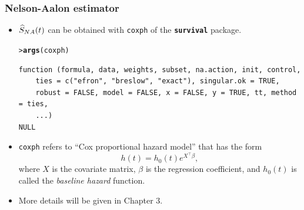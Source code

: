 \documentclass[10pt]{beamer}\usepackage[]{graphicx}\usepackage[]{color}
\makeatletter
\newcommand{\hlstd}[1]{\textcolor[rgb]{0.345,0.345,0.345}{#1}}%
\newcommand{\hlkwd}[1]{\textcolor[rgb]{0.737,0.353,0.396}{\textbf{#1}}}%
\newenvironment{kframe}{%
 \def\at@end@of@kframe{}%
 \ifinner\ifhmode%
  \def\at@end@of@kframe{\end{minipage}}%
  \begin{minipage}{\columnwidth}%
 \fi\fi%
 \def\FrameCommand##1{\hskip\@totalleftmargin \hskip-\fboxsep
 \colorbox{shadecolor}{##1}\hskip-\fboxsep
     \hskip-\linewidth \hskip-\@totalleftmargin \hskip\columnwidth}%
 \MakeFramed {\advance\hsize-\width
   \@totalleftmargin\z@ \linewidth\hsize
   \@setminipage}}%
 {\par\unskip\endMakeFramed%
 \at@end@of@kframe}
\newenvironment{knitrout}{}{} %
\renewenvironment{knitrout}{\setlength{\topsep}{-.2mm}}{}
\newcommand{\pkg}[1]{{\textbf{\texttt{#1}}}}
\newcommand{\code}[1]{{\texttt{#1}}}
\newcommand{\Sna}{\widehat{S}_{\scriptsize{NA}}}
\makeatother
\begin{document}
\begin{frame}[fragile]
  \frametitle{Nelson-Aalon estimator}
  \begin{itemize}
  \item $\Sna(t)$ can be obtained with \code{coxph} of the \pkg{survival} package.
\begin{knitrout}\scriptsize
{}\color{fgcolor}\begin{kframe}
\begin{alltt}
\hlstd{> }\hlkwd{args}\hlstd{(coxph)}
\end{alltt}
\begin{verbatim}
function (formula, data, weights, subset, na.action, init, control, 
    ties = c("efron", "breslow", "exact"), singular.ok = TRUE, 
    robust = FALSE, model = FALSE, x = FALSE, y = TRUE, tt, method = ties, 
    ...) 
NULL
\end{verbatim}
\end{kframe}
\end{knitrout}
  \item \code{coxph} refers to ``Cox proportional hazard model'' that has the form
    \begin{equation}
      h(t) = h_0(t) e^{X^\top\beta}, 
      \label{eq:cox}
    \end{equation}
    where $X$ is the covariate matrix, $\beta$ is the regression coefficient, 
    and $h_0(t)$ is called the \emph{baseline hazard} function.
  \item More details will be given in Chapter 3. 
  \end{itemize}
\end{frame}
\end{document}
